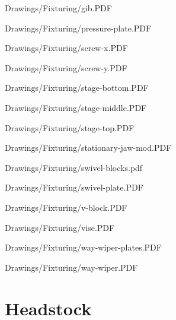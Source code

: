 
{Drawings/Fixturing/gib.PDF}


{Drawings/Fixturing/pressure-plate.PDF}


{Drawings/Fixturing/screw-x.PDF}


{Drawings/Fixturing/screw-y.PDF}


{Drawings/Fixturing/stage-bottom.PDF}


{Drawings/Fixturing/stage-middle.PDF}


{Drawings/Fixturing/stage-top.PDF}


{Drawings/Fixturing/stationary-jaw-mod.PDF}


{Drawings/Fixturing/swivel-blocks.pdf}


{Drawings/Fixturing/swivel-plate.PDF}


{Drawings/Fixturing/v-block.PDF}


{Drawings/Fixturing/vise.PDF}


{Drawings/Fixturing/way-wiper-plates.PDF}


{Drawings/Fixturing/way-wiper.PDF}

\section{Headstock}

